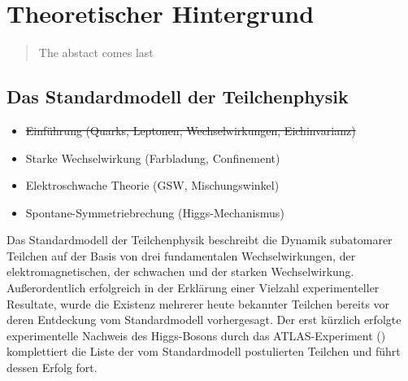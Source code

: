 


\chapter{Theoretischer Hintergrund}

\begin{quote}
    The abstact comes last
\end{quote}



\section{Das Standardmodell der Teilchenphysik}
\label{theory:standardmodell}

\begin{itemize}
    \item \sout{Einführung (Quarks, Leptonen, Wechselwirkungen, Eichinvarianz)}
    \item Starke Wechselwirkung (Farbladung, Confinement)
    \item Elektroschwache Theorie (GSW, Mischungswinkel)
    \item Spontane-Symmetriebrechung (Higgs-Mechanismus)
\end{itemize}

Das Standardmodell der Teilchenphysik beschreibt die Dynamik subatomarer
Teilchen auf der Basis von drei fundamentalen Wechselwirkungen, der
elektromagnetischen, der schwachen und der starken Wechselwirkung.
Außerordentlich erfolgreich in der Erklärung einer Vielzahl experimenteller
Resultate, wurde die Existenz mehrerer heute bekannter Teilchen bereits vor
deren Entdeckung vom Standardmodell vorhergesagt. Der erst kürzlich erfolgte
experimentelle Nachweis des Higgs-Bosons durch das ATLAS-Experiment
(\cite{Aad:2012tfa}) komplettiert die Liste der vom Standardmodell postulierten
Teilchen und führt dessen Erfolg fort.

